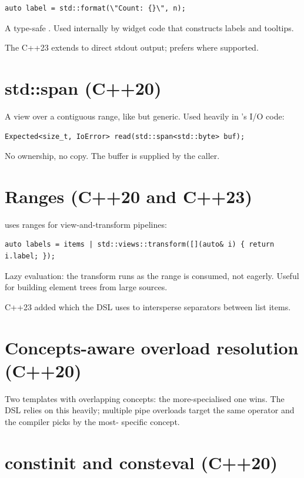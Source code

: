 \begin{lstlisting}
auto label = std::format(\"Count: {}\", n);
\end{lstlisting}

A type-safe . Used internally by widget code that
constructs labels and tooltips.

The C++23  extends  to direct
stdout output; \maya{} prefers  where supported.

\section{std::span (C++20)}

A view over a contiguous range, like  but
generic. Used heavily in \maya{}'s I/O code:

\begin{lstlisting}
Expected<size_t, IoError> read(std::span<std::byte> buf);
\end{lstlisting}

No ownership, no copy. The buffer is supplied by the caller.

\section{Ranges (C++20 and C++23)}

\maya{} uses ranges for view-and-transform pipelines:

\begin{lstlisting}
auto labels = items | std::views::transform([](auto& i) { return i.label; });
\end{lstlisting}

Lazy evaluation: the transform runs as the range is consumed,
not eagerly. Useful for building element trees from large
sources.

C++23 added  which the DSL uses to
intersperse separators between list items.

\section{Concepts-aware overload resolution (C++20)}

Two templates with overlapping concepts: the more-specialised
one wins. The DSL relies on this heavily; multiple pipe overloads
target the same operator and the compiler picks by the most-
specific concept.

\section{constinit and consteval (C++20)}

